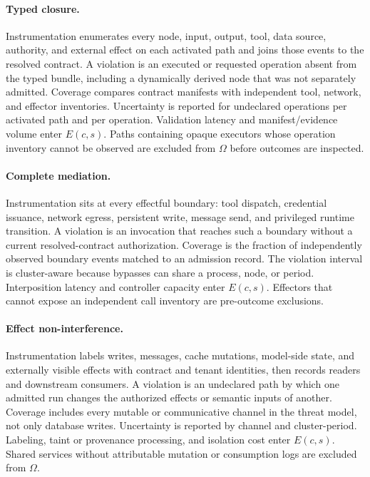 \documentclass[11pt]{article}
\begin{document}
\paragraph{Typed closure.}
Instrumentation enumerates every node, input, output, tool, data source, authority, and external effect on each activated path and joins those events to the resolved contract. A violation is an executed or requested operation absent from the typed bundle, including a dynamically derived node that was not separately admitted. Coverage compares contract manifests with independent tool, network, and effector inventories. Uncertainty is reported for undeclared operations per activated path and per operation. Validation latency and manifest/evidence volume enter $E(c,s)$. Paths containing opaque executors whose operation inventory cannot be observed are excluded from $\Omega$ before outcomes are inspected.

\paragraph{Complete mediation.}
Instrumentation sits at every effectful boundary: tool dispatch, credential issuance, network egress, persistent write, message send, and privileged runtime transition. A violation is an invocation that reaches such a boundary without a current resolved-contract authorization. Coverage is the fraction of independently observed boundary events matched to an admission record. The violation interval is cluster-aware because bypasses can share a process, node, or period. Interposition latency and controller capacity enter $E(c,s)$. Effectors that cannot expose an independent call inventory are pre-outcome exclusions.

\paragraph{Effect non-interference.}
Instrumentation labels writes, messages, cache mutations, model-side state, and externally visible effects with contract and tenant identities, then records readers and downstream consumers. A violation is an undeclared path by which one admitted run changes the authorized effects or semantic inputs of another. Coverage includes every mutable or communicative channel in the threat model, not only database writes. Uncertainty is reported by channel and cluster-period. Labeling, taint or provenance processing, and isolation cost enter $E(c,s)$. Shared services without attributable mutation or consumption logs are excluded from $\Omega$.
\end{document}

